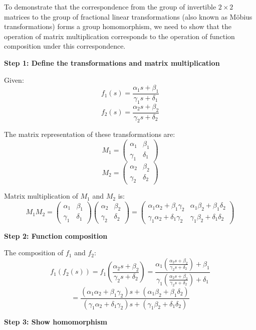\documentclass[8pt]{article}
\begin{document}
To demonstrate that the correspondence from the group of invertible \(2 \times 2\) matrices to the group of fractional linear transformations (also known as Möbius transformations) forms a group homomorphism, we need to show that the operation of matrix multiplication corresponds to the operation of function composition under this correspondence. 

\textbf{Step 1: Define the transformations and matrix multiplication}

Given:
\[ f_1(s) = \frac{\alpha_1 s + \beta_1}{\gamma_1 s + \delta_1} \]
\[ f_2(s) = \frac{\alpha_2 s + \beta_2}{\gamma_2 s + δ_2} \]

The matrix representation of these transformations are:
\[ M_1 = \begin{pmatrix} \alpha_1 & \beta_1 \\ \gamma_1 & \delta_1 \end{pmatrix} \]
\[ M_2 = \begin{pmatrix} \alpha_2 & \beta_2 \\ \gamma_2 & \delta_2 \end{pmatrix} \]

Matrix multiplication of \( M_1 \) and \( M_2 \) is:
\[ M_1 M_2 = \begin{pmatrix} \alpha_1 & \beta_1 \\ \gamma_1 & \delta_1 \end{pmatrix} \begin{pmatrix} \alpha_2 & \beta_2 \\ \gamma_2 & \delta_2 \end{pmatrix} = \begin{pmatrix} \alpha_1\alpha_2 + \beta_1\gamma_2 & \alpha_1\beta_2 + \beta_1\delta_2 \\ \gamma_1\alpha_2 + \delta_1\gamma_2 & \gamma_1\beta_2 + \delta_1\delta_2 \end{pmatrix} \]

\textbf{Step 2: Function composition}

The composition of \( f_1 \) and \( f_2 \):
\[ f_1(f_2(s)) = f_1\left(\frac{\alpha_2 s + \beta_2}{\gamma_2 s + \delta_2}\right) = \frac{\alpha_1 \left(\frac{\alpha_2 s + \beta_2}{\gamma_2 s + \delta_2}\right) + \beta_1}{\gamma_1 \left(\frac{\alpha_2 s + \beta_2}{\gamma_2 s + \delta_2}\right) + \delta_1} \]
\[ = \frac{(\alpha_1\alpha_2 + \beta_1\gamma_2)s + (\alpha_1\beta_2 + \beta_1\delta_2)}{(\gamma_1\alpha_2 + \delta_1\gamma_2)s + (\gamma_1\beta_2 + \delta_1\delta_2)} \]

\textbf{Step 3: Show homomorphism}
\end{document}
